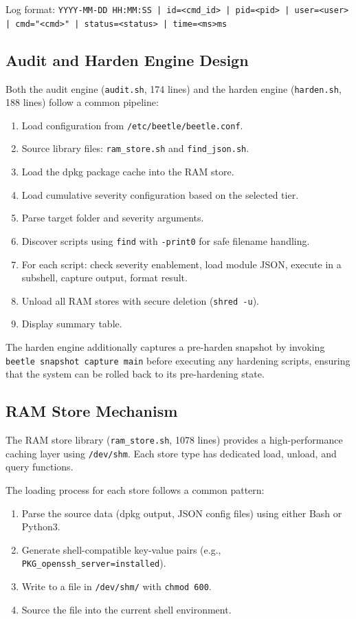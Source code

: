 Log format: \texttt{YYYY-MM-DD HH:MM:SS | id=<cmd\_id> | pid=<pid> | user=<user> | cmd="<cmd>" | status=<status> | time=<ms>ms}

\subsection{Audit and Harden Engine Design}

Both the audit engine (\texttt{audit.sh}, 174 lines) and the harden engine (\texttt{harden.sh}, 188 lines) follow a common pipeline:

\begin{enumerate}[noitemsep]
    \item Load configuration from \texttt{/etc/beetle/beetle.conf}.
    \item Source library files: \texttt{ram\_store.sh} and \texttt{find\_json.sh}.
    \item Load the dpkg package cache into the RAM store.
    \item Load cumulative severity configuration based on the selected tier.
    \item Parse target folder and severity arguments.
    \item Discover scripts using \texttt{find} with \texttt{-print0} for safe filename handling.
    \item For each script: check severity enablement, load module JSON, execute in a subshell, capture output, format result.
    \item Unload all RAM stores with secure deletion (\texttt{shred -u}).
    \item Display summary table.
\end{enumerate}

The harden engine additionally captures a pre-harden snapshot by invoking \texttt{beetle snapshot capture main} before executing any hardening scripts, ensuring that the system can be rolled back to its pre-hardening state.

\subsection{RAM Store Mechanism}

The RAM store library (\texttt{ram\_store.sh}, 1078 lines) provides a high-performance caching layer using \texttt{/dev/shm}. Each store type has dedicated load, unload, and query functions.

The loading process for each store follows a common pattern:
\begin{enumerate}[noitemsep]
    \item Parse the source data (dpkg output, JSON config files) using either Bash or Python3.
    \item Generate shell-compatible key-value pairs (e.g., \texttt{PKG\_openssh\_server=installed}).
    \item Write to a file in \texttt{/dev/shm/} with \texttt{chmod 600}.
    \item Source the file into the current shell environment.
\end{enumerate}

